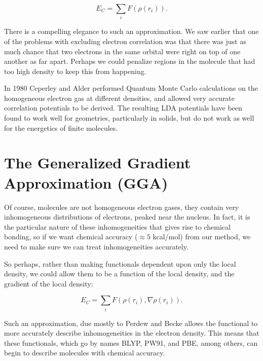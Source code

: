 \begin{equation}
	E_C = \sum_i F(\rho(r_i)).
\end{equation}

\noindent There is a compelling elegance to such an approximation. We
saw earlier that one of the problems with excluding electron
correlation was that there was just as much chance that two electrons
in the same orbital were right on top of one another as far
apart. Perhaps we could penalize regions in the molecule that had too
high density to keep this from happening.

In 1980 Ceperley and Alder performed Quantum Monte
Carlo calculations on the homogeneous electron gas at different
densities, and allowed very accurate correlation potentials to be
derived. The resulting LDA
potentials have been found to work well for geometries, particularly
in solids, but do not work as well for the energetics of finite
molecules. 

\section{The Generalized Gradient Approximation (GGA)}
Of course, molecules are not homogeneous electron gases, they contain
very inhomogeneous distributions of electrons, peaked near the
nucleus. In fact, it is the particular nature of these inhomogeneities
that gives rise to chemical bonding, so if we want chemical accuracy
($\approx 5$ kcal/mol) from our method, we need to make sure we can 
treat inhomogeneities accurately.

So perhaps, rather than making functionals dependent upon only the
local density, we could allow them to be a function of the local
density, and the gradient of the local density:

\begin{equation}
	E_C = \sum_i F(\rho(r_i),\nabla\rho(r_i)).
\end{equation}

\noindent Such an approximation, due mostly to Perdew 
and Becke allows the functional to
more accurately describe inhomogeneities in the electron density. This
means that these functionals, which go by names BLYP, PW91, and PBE,
among others, can begin to describe molecules with chemical accuracy.


